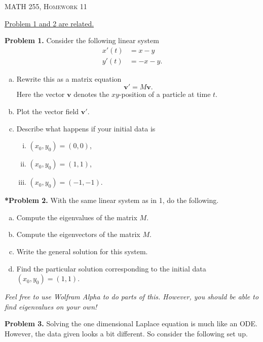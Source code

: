 \documentclass[12pt]{report} %
\theoremstyle{definition}
\begin{document}
\begin{center}
   \textsc{\large MATH 255, Homework 11}\\
\end{center}
\vspace{.5cm}

\begin{center}
\underline{Problem 1 and 2 are related.}
\end{center}
\noindent\textbf{Problem 1.} Consider the following linear system 
\begin{align*}
    x'(t) &= x-y \\
    y'(t) &= -x-y.
\end{align*}
\begin{enumerate}[(a)]
    \item Rewrite this as a matrix equation
    \[
    \mathbf{v}' = M\mathbf{v}.
    \]
    Here the vector $\mathbf{v}$ denotes the $xy$-position of a particle at time $t$.
    \item Plot the vector field $\mathbf{v}'$.
    \item Describe what happens if your initial data is
    \begin{enumerate}[i.]
        \item $(x_0,y_0)=(0,0)$,
        \item $(x_0,y_0)=(1,1)$,
        \item $(x_0,y_0)=(-1,-1)$.
    \end{enumerate}
    
\end{enumerate}

\noindent\textbf{*Problem 2.} With the same linear system as in 1, do the following.
\begin{enumerate}[(a)]
    \item Compute the eigenvalues of the matrix $M$.
    \item Compute the eigenvectors of the matrix $M$.
    \item Write the general solution for this system.
    \item Find the particular solution corresponding to the initial data $(x_0,y_0)=(1,1)$.
\end{enumerate}
\emph{Feel free to use Wolfram Alpha to do parts of this.  However, you should be able to find eigenvalues on your own!}
\vspace*{.5cm}

\noindent\textbf{Problem 3.} Solving the one dimensional Laplace equation is much like an ODE.  However, the data given looks a bit different.  So consider the following set up.
\end{document}
